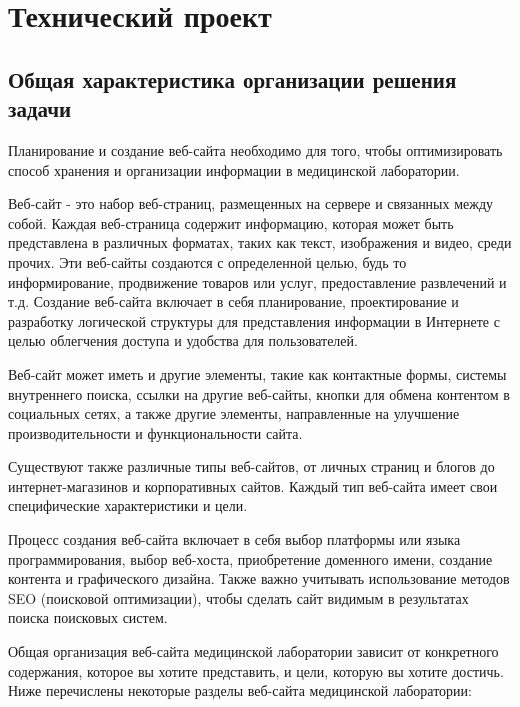 \newsection
\section{Технический проект}
\subsection{Общая характеристика организации решения задачи}

Планирование и создание веб-сайта необходимо для того, чтобы оптимизировать способ хранения и организации информации в медицинской лаборатории.

Веб-сайт - это набор веб-страниц, размещенных на сервере и связанных между собой. Каждая веб-страница содержит информацию, которая может быть представлена в различных форматах, таких как текст, изображения и видео, среди прочих. Эти веб-сайты создаются с определенной целью, будь то информирование, продвижение товаров или услуг, предоставление развлечений и т.д. Создание веб-сайта включает в себя планирование, проектирование и разработку логической структуры для представления информации в Интернете с целью облегчения доступа и удобства для пользователей\cite{website}.

Веб-сайт может иметь и другие элементы, такие как контактные формы, системы внутреннего поиска, ссылки на другие веб-сайты, кнопки для обмена контентом в социальных сетях, а также другие элементы, направленные на улучшение производительности и функциональности сайта.

Существуют также различные типы веб-сайтов, от личных страниц и блогов до интернет-магазинов и корпоративных сайтов. Каждый тип веб-сайта имеет свои специфические характеристики и цели.

Процесс создания веб-сайта включает в себя выбор платформы или языка программирования, выбор веб-хоста, приобретение доменного имени, создание контента и графического дизайна. Также важно учитывать использование методов SEO (поисковой оптимизации), чтобы сделать сайт видимым в результатах поиска поисковых систем.

Общая организация веб-сайта медицинской лаборатории зависит от конкретного содержания, которое вы хотите представить, и цели, которую вы хотите достичь. Ниже перечислены некоторые разделы веб-сайта медицинской лаборатории:

